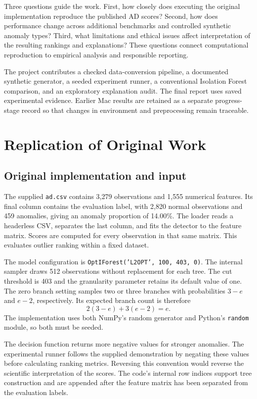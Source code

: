 \documentclass[11pt]{article}
\begin{document}
Three questions guide the work. First, how closely does executing the original implementation reproduce the published AD scores? Second, how does performance change across additional benchmarks and controlled synthetic anomaly types? Third, what limitations and ethical issues affect interpretation of the resulting rankings and explanations? These questions connect computational reproduction to empirical analysis and responsible reporting.

The project contributes a checked data-conversion pipeline, a documented synthetic generator, a seeded experiment runner, a conventional Isolation Forest comparison, and an exploratory explanation audit. The final report uses saved experimental evidence. Earlier Mac results are retained as a separate progress-stage record so that changes in environment and preprocessing remain traceable.

\section{Replication of Original Work}
\subsection{Original implementation and input}
The supplied \texttt{ad.csv} contains 3,279 observations and 1,555 numerical features. Its final column contains the evaluation label, with 2,820 normal observations and 459 anomalies, giving an anomaly proportion of 14.00\%. The loader reads a headerless CSV, separates the last column, and fits the detector to the feature matrix. Scores are computed for every observation in that same matrix. This evaluates outlier ranking within a fixed dataset.

The model configuration is \texttt{OptIForest('L2OPT', 100, 403, 0)}. The internal sampler draws 512 observations without replacement for each tree. The cut threshold is 403 and the granularity parameter retains its default value of one. The zero branch setting samples two or three branches with probabilities $3-e$ and $e-2$, respectively. Its expected branch count is therefore
\begin{equation}
2(3-e)+3(e-2)=e.
\end{equation}
The implementation uses both NumPy's random generator and Python's \texttt{random} module, so both must be seeded.

The decision function returns more negative values for stronger anomalies. The experimental runner follows the supplied demonstration by negating these values before calculating ranking metrics. Reversing this convention would reverse the scientific interpretation of the scores. The code's internal row indices support tree construction and are appended after the feature matrix has been separated from the evaluation labels.
\end{document}
